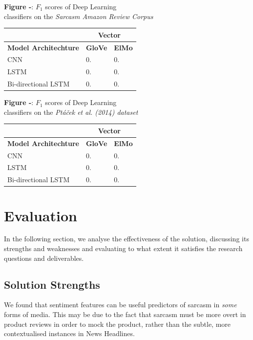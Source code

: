 \documentclass[12pt,a4paper]{article}
\begin{document}
\begin{center}
	\textbf{Figure -}: $F_1$ scores of Deep Learning\\ classifiers on the \textit{Sarcasm Amazon Review Corpus}
\end{center}

\begin{center}
	\begin{tabular}{ |p{4.7cm}||p{1.2cm}|p{1.5cm}|  }
		\hline
		& \multicolumn{2}{|c|}{\textbf{Vector}} \\
		\hline
		\textbf{Model Architechture}& \textbf{GloVe} & \textbf{ElMo}\\
		\hline\hline
		CNN   & 0.  & 0.\\
		LSTM &   0. & 0.\\
		Bi-directional LSTM &0. & 0.\\
		\hline
	\end{tabular}
\end{center}



\begin{center}
	\textbf{Figure -}: $F_1$ scores of Deep Learning\\ classifiers on the \textit{Pt\'a\v{c}ek et al. (2014) dataset}
\end{center}

\begin{center}
	\begin{tabular}{ |p{4.7cm}||p{1.2cm}|p{1.5cm}|  }
		\hline
		& \multicolumn{2}{|c|}{\textbf{Vector}} \\
		\hline
		\textbf{Model Architechture}& \textbf{GloVe} & \textbf{ElMo}\\
		\hline\hline
		CNN   & 0.  & 0.\\
		LSTM &   0. & 0.\\
		Bi-directional LSTM &0. & 0.\\
		\hline
	\end{tabular}
\end{center}

\newpage


\section{Evaluation}
In the following section, we analyse the effectiveness of the solution, discussing its strengths and weaknesses and evaluating to what extent it satisfies the research questions and deliverables.

\subsection{Solution Strengths}
We found that sentiment features can be useful predictors of sarcasm in \textit{some} forms of media. This may be due to the fact that sarcasm must be more overt in product reviews in order to mock the product, rather than the subtle, more contextualised instances in News Headlines.
\end{document}
